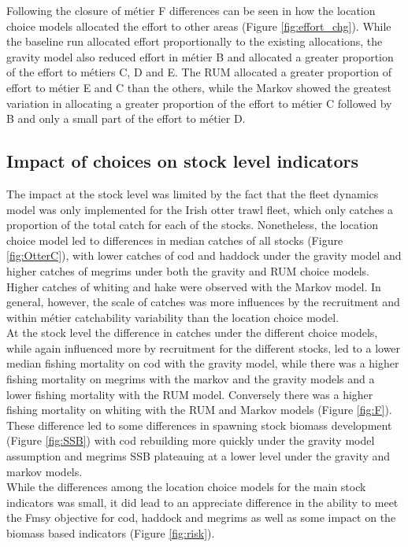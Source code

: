 \documentclass[12pt, halfline, a4paper]{ouparticle}
\begin{document}
Following the closure of métier F differences can be seen in how the location
choice models allocated the effort to other areas (Figure
\ref{fig:effort_chg}). While the baseline run allocated effort proportionally
to the existing allocations, the gravity model also reduced effort in métier B
and allocated a greater proportion of the effort to métiers C, D and E. The RUM
allocated a greater proportion of effort to métier E and C than the others,
while the Markov showed the greatest variation in allocating a greater
proportion of the effort to métier C followed by B and only a small part of the
effort to métier D.

\subsection{Impact of choices on stock level indicators}

The impact at the stock level was limited by the fact that the fleet dynamics
model was only implemented for the Irish otter trawl fleet, which only catches
a proportion of the total catch for each of the stocks. Nonetheless, the
location choice model led to differences in median catches of all stocks
(Figure \ref{fig:OtterC}), with lower catches of cod and haddock under the
gravity model and higher catches of megrims under both the gravity and RUM
choice models. Higher catches of whiting and hake were observed with the Markov
model.  In general, however, the scale of catches was more influences by the
recruitment and within métier catchability variability than the location choice
model. \\

At the stock level the difference in catches under the different choice models,
while again influenced more by recruitment for the different stocks, led to a
lower median fishing mortality on cod with the gravity model, while there was a
higher fishing mortality on megrims with the markov and the gravity models and
a lower fishing mortality with the RUM model. Conversely there was a higher
fishing mortality on whiting with the RUM and Markov models (Figure
\ref{fig:F}). These difference led to some differences in spawning stock
biomass development (Figure \ref{fig:SSB}) with cod rebuilding more quickly
under the gravity model assumption and megrims SSB plateauing at a lower level
under the gravity and markov models. \\

While the differences among the location choice models for the main stock
indicators was small, it did lead to an appreciate difference in the ability to
meet the Fmsy objective for cod, haddock and megrims as well as some impact on
the biomass based indicators (Figure \ref{fig:risk}). 
\end{document}
